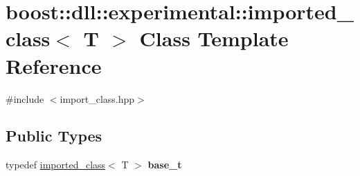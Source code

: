 \hypertarget{a01664}{}\section{boost\+:\+:dll\+:\+:experimental\+:\+:imported\+\_\+class$<$ T $>$ Class Template Reference}
\label{a01664}


{\ttfamily \#include $<$import\+\_\+class.\+hpp$>$}

\subsection*{Public Types}
\begin{DoxyCompactItemize}
\item 
\mbox{\label{a01664_acc2cfce842c9bac2feccb2a601f8bdc7}} 
typedef \hyperlink{a01664}{imported\+\_\+class}$<$ T $>$ {\bfseries base\+\_\+t}
\end{DoxyCompactItemize}
